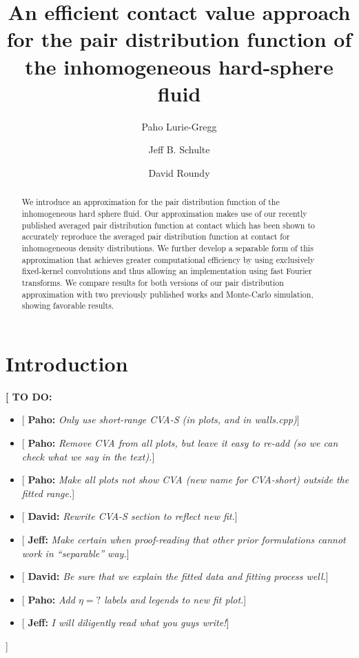 \documentclass[letterpaper,twocolumn,amsmath,amssymb,pre,aps,10pt]{revtex4-1}
\newcommand{\red}[1]{{\bf \color{red} #1}}
\newcommand{\green}[1]{{\bf \color{green} #1}}
\newcommand{\blue}[1]{{\bf \color{blue} #1}}
\newcommand{\cyan}[1]{{\bf \color{cyan} #1}}
\newcommand{\fixme}[1]{\red{[#1]}}
\newcommand{\davidsays}[1]{{\color{red} [\green{David:} \emph{#1}]}}
\newcommand{\jeffsays}[1]{{\color{red} [\cyan{Jeff:} \emph{#1}]}}
\newcommand{\pahosays}[1]{{\color{red} [\blue{Paho:} \emph{#1}]}}
\begin{document}
\title{An efficient contact value approach for the pair distribution
  function of the inhomogeneous hard-sphere fluid}

\author{Paho Lurie-Gregg}
\author{Jeff B. Schulte}
\author{David Roundy}

\begin{abstract}
We introduce an approximation for the pair distribution function of
the inhomogeneous hard sphere fluid. Our approximation makes use of
our recently published averaged pair distribution function at contact
which has been shown to accurately reproduce the averaged pair
distribution function at contact for inhomogeneous density
distributions. We further develop a separable form of this
approximation that achieves greater computational efficiency by using
exclusively fixed-kernel convolutions and thus allowing an
implementation using fast Fourier transforms. We compare results for
both versions of our pair distribution approximation with two
previously published works and Monte-Carlo simulation, showing
favorable results.
\end{abstract}

\maketitle

\section{Introduction}

\fixme{
  TO DO:
  \begin{itemize}
  \item \pahosays{Only use short-range CVA-S (in plots, and in walls.cpp)}
  \item \pahosays{Remove CVA from all plots, but leave it easy to
    re-add (so we can check what we say in the text).}
  \item \pahosays{Make all plots not show CVA (new name for CVA-short)
    outside the fitted range.}
  \item \davidsays{Rewrite CVA-S section to reflect new fit.}
  \item \jeffsays{Make certain when proof-reading that other prior
    formulations cannot work in ``separable'' way.}
  \item \davidsays{Be sure that we explain the fitted data and fitting
    process well.}
  \item \pahosays{Add $\eta=?$ labels and legends to new fit plot.}
  \item \jeffsays{I will diligently read what you guys write!}
  \end{itemize}
}
\end{document}
